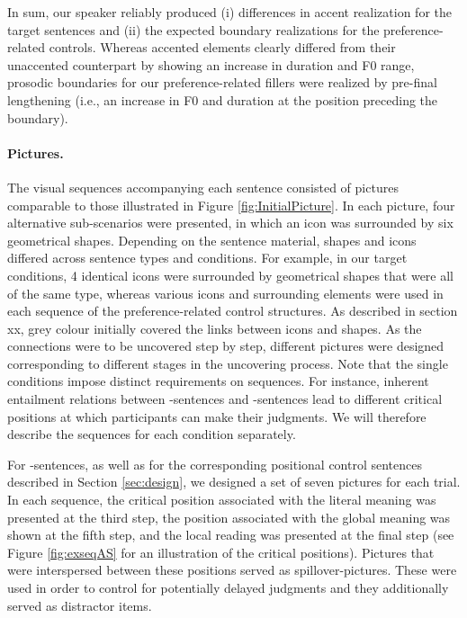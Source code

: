 \documentclass[fleqn,reqno,10pt,draft]{article}
\newcommand{\as}{\acro{as}}
\renewcommand{\es}{\acro{es}}
\begin{document}
In sum, our speaker reliably
produced (i) differences in accent realization for the target
sentences and (ii) the expected boundary realizations for the
preference-related controls. Whereas accented elements clearly
differed from their unaccented counterpart by showing an increase in
duration and F0 range, prosodic boundaries for our preference-related
fillers were realized by pre-final lengthening (i.e., an increase in F0
and duration at the position preceding the boundary).


\paragraph{Pictures.}
The visual sequences accompanying each sentence consisted of pictures
comparable to those illustrated in Figure \ref{fig:InitialPicture}. In
each picture, four alternative sub-scenarios were presented, in which
an icon was surrounded by six geometrical shapes. Depending on the
sentence material, shapes and icons differed across sentence types and
conditions. For example, in our target conditions, 4 identical icons
were surrounded by geometrical shapes that were all of the same type,
whereas various icons and surrounding elements were used in each
sequence of the preference-related control structures. As described in
section xx, grey colour initially covered the links between icons and
shapes. As the connections were to be uncovered step by step,
different pictures were designed corresponding to different stages in
the uncovering process. Note that the single conditions impose
distinct requirements on sequences. For instance, inherent entailment
relations between \as-sentences and \es-sentences lead to different
critical positions at which participants can make their judgments. We
will therefore describe the sequences for each condition separately.

For \as-sentences, as well as for the corresponding positional control
sentences described in Section \ref{sec:design}, we designed a set of
seven pictures for each trial. In each sequence, the critical position
associated with the literal meaning was presented at the third step,
the position associated with the global meaning was shown at the fifth
step, and the local reading was presented at the final step (see
Figure \ref{fig:exseqAS} for an illustration of the critical
positions). Pictures that were interspersed between these positions
served as spillover-pictures. These were used in order to control for
potentially delayed judgments and they additionally served as
distractor items.
\end{document}
